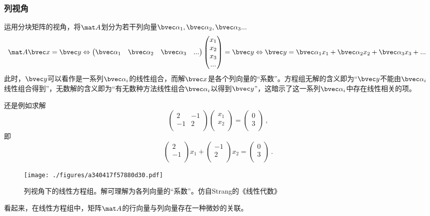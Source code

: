 \subsubsection{列视角}
运用分块矩阵的视角，将$\mat A$划分为若干列向量$\bvec \alpha_1, \bvec \alpha_2,\bvec \alpha_3...$
$$
\mat A \bvec x=\bvec y \Leftrightarrow 
\begin{pmatrix}
\bvec \alpha_1& \bvec \alpha_2& \bvec \alpha_3&...
\end{pmatrix}
\begin{pmatrix}
x_{1}\\
x_{2}\\
x_{3}\\
...\\
\end{pmatrix}
=
\bvec y
\Leftrightarrow 
\bvec y = \bvec \alpha_1 x_1+\bvec \alpha_2 x_2+\bvec \alpha_3 x_3+...~
$$
此时，$\bvec y$可以看作是一系列$\bvec \alpha_i$的线性组合，而解$\bvec x$是各个列向量的“系数”。方程组无解的含义即为“$\bvec y$不能由$\bvec \alpha_i$线性组合得到”，无数解的含义即为“有无数种方法线性组合$\bvec \alpha_i$以得到$\bvec y$”，这暗示了这一系列$\bvec \alpha_i$中存在线性相关的项。

\begin{example}{}
还是例如求解
$$
\begin{pmatrix}
2&-1\\
-1&2\\
\end{pmatrix}
\begin{pmatrix}
x_1\\
x_2\\
\end{pmatrix}
=
\begin{pmatrix}
0\\
3\\
\end{pmatrix}~,
$$
即
$$
\begin{pmatrix}
2\\
-1\\
\end{pmatrix}
x_1
+
\begin{pmatrix}
-1\\
2\\
\end{pmatrix}
x_2
=
\begin{pmatrix}
0\\
3\\
\end{pmatrix}~.
$$
\begin{figure}[ht]
\centering
\texttt{[image: ./figures/a340417f57880d30.pdf]}
\caption{列视角下的线性方程组。解可理解为各列向量的“系数”。仿自Strang的《线性代数》} \label{fig_LinEq_4}
\end{figure}
\end{example}
看起来，在线性方程组中，矩阵$\mat A$的行向量与列向量存在一种微妙的关联。

